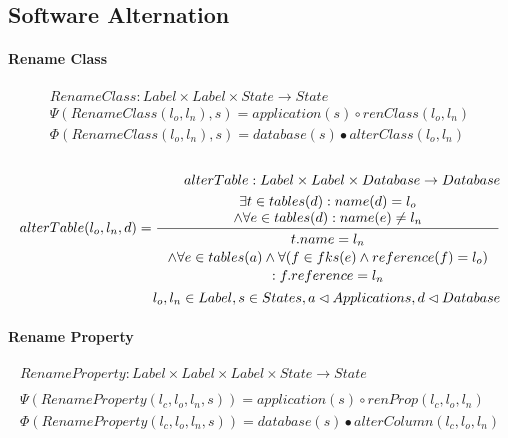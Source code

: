 \documentclass[11pt]{article}
\begin{document}
\subsection{Software Alternation}
\paragraph{Rename Class}
\begin{align*}
RenameClass : Label \times Label \times State \rightarrow State \\ 
\Psi(RenameClass(l_o, l_n), s) = application(s) \circ renClass(l_o, l_n) \\
\Phi(RenameClass(l_o, l_n), s) = database(s) \bullet alterClass(l_o, l_n) \\ \\
\end{align*}

\begin{align*}
alterTable:  Label \times Label \times Database \rightarrow Database \\
alterTable(l_o, l_n, d) = \inference{\exists t \in tables(d) : name(d) = l_o \\ \wedge \forall e \in tables(d) : name(e) \neq l_n}{\begin{gathered}
t.name = l_n \\ \wedge \forall e \in tables(a) \wedge \forall (f \in fks(e) \wedge reference(f) = l_o ) \\ : f.reference = l_n 
\end{gathered}}\\
l_o, l_n \in Label, s \in States, a \lhd Applications, d \lhd Database
\end{align*}

\paragraph{Rename Property}
\begin{align*}
	RenameProperty : Label \times Label \times Label \times State \rightarrow State \\ \\
\Psi(RenameProperty(l_c, l_o, l_n, s)) = application(s) \circ renProp(l_c, l_o, l_n) \\
\Phi(RenameProperty(l_c, l_o, l_n, s)) = database(s) \bullet alterColumn(l_c, l_o, l_n) \\\\
\end{align*}
\end{document}
